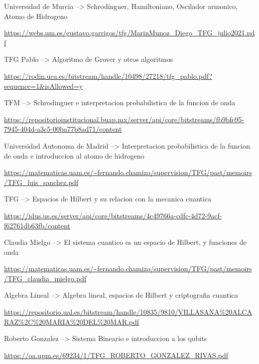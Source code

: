 \documentclass{article}
\numberwithin{equation}{section} %
\begin{document}
        Universidad de Murcia --> Schrodinguer, Hamiltoniano, Oscilador armonico, Atomo de Hidrogeno\par
        \url{https://webs.um.es/gustavo.garrigos/tfg/MarinMunoz\_Diego\_TFG\_julio2021.pdf}
        \vspace{2mm}

        TFG Pablo --> Algoritmo de Grover y otros algoritmos\par
        \url{https://rodin.uca.es/bitstream/handle/10498/27218/tfg\_pablo.pdf?sequence=1\&isAllowed=y}
        \vspace{2mm}

        TFM --> Schrodinguer e interpretacion probabilistica de la funcion de onda\par
        \url{https://repositorioinstitucional.buap.mx/server/api/core/bitstreams/fb9bfe95-7945-404d-a3c5-00ba77b8ad71/content}
        \vspace{2mm}

        Universidad Autonoma de Madrid --> Interpretacion probabilistica de la funcion de onda e introduccion al atomo de hidrogeno\par
        \url{https://matematicas.uam.es/~fernando.chamizo/supervision/TFG/past/memoirs/TFG\_luis\_sanchez.pdf}
        \vspace{2mm}

        TFG --> Espacios de Hilbert y su relacion con la mecanica cuantica\par
        \url{https://idus.us.es/server/api/core/bitstreams/4c49766a-cdfc-4d72-9acf-f62761db63fb/content}
        \vspace{2mm}

        Claudia Mielgo --> El sistema cuantico es un espacio de Hilbert, y funciones de onda\par
        \url{https://matematicas.uam.es/~fernando.chamizo/supervision/TFG/past/memoirs/TFG\_claudia\_mielgo.pdf}
        \vspace{2mm}

        Algebra Lineal --> Algebra lineal, espacios de Hilbert y criptografia cuantica\par
        \url{https://repositorio.ual.es/bitstream/handle/10835/9810/VILLASANA%20ALCARAZ%2C%20MARIA%20DEL%20MAR.pdf}
        \vspace{2mm}

        Roberto Gonzalez --> Sistema Bineario e introduccion a los qubits\par
        \url{https://oa.upm.es/69234/1/TFG\_ROBERTO\_GONZALEZ\_RIVAS.pdf}
        \vspace{2mm}
\end{document}

